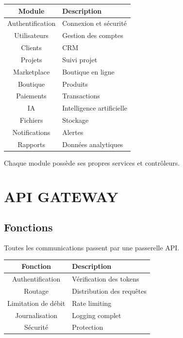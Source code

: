 \documentclass[12pt,a4paper,oneside]{book}
\begin{document}
\begin{center}
\begin{tabular}{|c|p{10cm}|}
\hline
\rowcolor{electroncyan}
\color{white}\textbf{Module} & \color{white}\textbf{Description} \\
\hline
Authentification & Connexion et sécurité \\
\hline
Utilisateurs & Gestion des comptes \\
\hline
Clients & CRM \\
\hline
Projets & Suivi projet \\
\hline
Marketplace & Boutique en ligne \\
\hline
Boutique & Produits \\
\hline
Paiements & Transactions \\
\hline
IA & Intelligence artificielle \\
\hline
Fichiers & Stockage \\
\hline
Notifications & Alertes \\
\hline
Rapports & Données analytiques \\
\hline
\end{tabular}
\end{center}

Chaque module possède ses propres services et contrôleurs.

\chapter{API GATEWAY}

\section{Fonctions}
Toutes les communications passent par une passerelle API.

\begin{center}
\begin{tabular}{|c|p{10cm}|}
\hline
\rowcolor{electronblue}
\color{white}\textbf{Fonction} & \color{white}\textbf{Description} \\
\hline
Authentification & Vérification des tokens \\
\hline
Routage & Distribution des requêtes \\
\hline
Limitation de débit & Rate limiting \\
\hline
Journalisation & Logging complet \\
\hline
Sécurité & Protection \\
\hline
\end{tabular}
\end{center}
\end{document}
